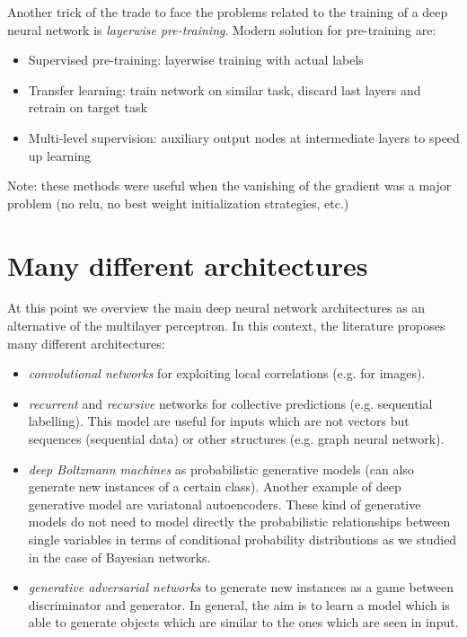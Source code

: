 Another trick of the trade to face the problems related to the training of a deep
neural network is \textit{layerwise pre-training}. Modern solution for pre-training
are:
\begin{itemize}
	\item Supervised pre-training: layerwise training with actual labels

	\item Transfer learning: train network on similar task, discard last layers and
		retrain on target task

	\item Multi-level supervision: auxiliary output nodes at intermediate layers
		to speed up learning
\end{itemize}
Note: these methods were useful when the vanishing of the gradient was a 
major problem (no relu, no best weight initialization strategies, etc.)

\section{Many different architectures}
At this point we overview the main deep neural network architectures as an
alternative of the multilayer perceptron. In this context, the literature
proposes many different architectures:

\begin{itemize}
	\item \textit{convolutional networks} for exploiting local correlations (e.g.
		for images).

	\item \textit{recurrent} and \textit{recursive} networks for collective predictions
		(e.g. sequential labelling). This model are useful for inputs which are not vectors
		but sequences (sequential data) or other structures (e.g. graph neural network).

	\item \textit{deep Boltzmann machines} as probabilistic generative models (can
		also generate new instances of a certain class). Another example of deep generative
		model are variatonal autoencoders. These kind of generative models do not
		need to model directly the probabilistic relationships between single
		variables in terms of conditional probability distributions as we studied in
		the case of Bayesian networks.

	\item \textit{generative adversarial networks} to generate new instances as a
		game between discriminator and generator. In general, the aim is to learn a
		model which is able to generate objects which are similar to the ones which
		are seen in input.
\end{itemize}

